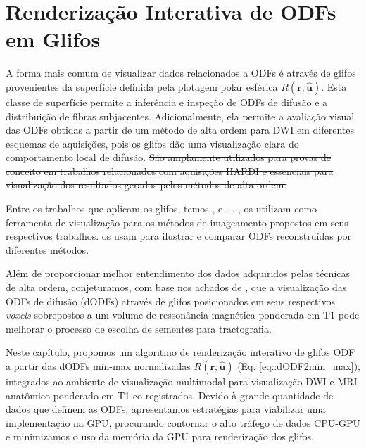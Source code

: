 \chapter{Renderização Interativa de \difusao ODFs em Glifos}
\label{chap::renderizacao_interativa_de_perfis_de_difusao}


A forma mais comum de visualizar dados relacionados a ODFs é através de glifos provenientes da superfície definida pela plotagem polar esférica $R(\mathbf{r} , \mathbf{\hat{u}})$. Esta classe de superfície permite a inferência e inspeção de ODFs de difusão e a distribuição de fibras subjacentes. Adicionalmente, ela permite a avaliação visual das ODFs obtidas a partir de um método de alta ordem para DWI em diferentes esquemas de aquisições, pois os glifos dão uma visualização clara do comportamento local de difusão. \sout{São amplamente utilizados para provas de conceito em trabalhos relacionados com aquisições HARDI e essenciais para visualização dos resultados gerados pelos métodos de alta ordem.}

Entre os trabalhos que aplicam os glifos, temos ,   e  .  . ,   os utilizam como ferramenta de visualização para os métodos de imageamento propostos em seus respectivos trabalhos.  os usam para ilustrar e comparar ODFs reconstruídas por diferentes métodos.


Além de proporcionar melhor entendimento dos dados adquiridos pelas técnicas de alta ordem, conjeturamos, com base nos achados de , que a visualização das ODFs de difusão (dODFs) através de glifos posicionados em seus respectivos \textit{voxels} sobrepostos a um volume de ressonância magnética ponderada em T1 pode melhorar o processo de escolha de sementes para tractografia.

Neste capítulo, propomos um algoritmo de renderização 
interativo de glifos ODF a partir das dODFs min-max normalizadas $R(\mathbf{r}, \mathbf{\mathbf{\hat{u}}})$ (Eq. \ref{eq::dODF2min_max}), integrados ao ambiente de visualização multimodal para visualização DWI e MRI anatômico ponderado em T1 co-registrados. Devido à grande quantidade de dados que definem as ODFs, apresentamos estratégias para viabilizar uma implementação na GPU, procurando contornar o alto tráfego de dados CPU-GPU e minimizamos o uso da memória da GPU para renderização dos glifos.


